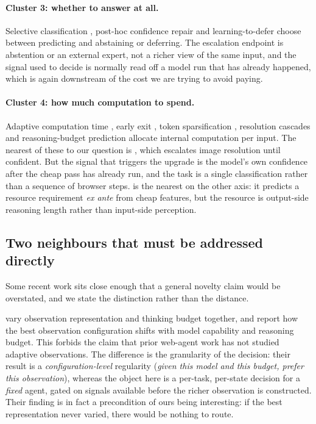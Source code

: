 \paragraph{Cluster 3: whether to answer at all.} Selective classification
\citep{geifman2017selective, geifman2019selectivenet, liu2019deepgamblers},
post-hoc confidence repair \citep{cattelan2024confidence} and learning-to-defer
\citep{mozannar2020defer} choose between predicting and abstaining or deferring.
The escalation endpoint is abstention or an external expert, not a richer view
of the same input, and the signal used to decide is normally read off a model
run that has already happened, which is again downstream of the cost we are
trying to avoid paying.

\paragraph{Cluster 4: how much computation to spend.} Adaptive computation
time \citep{graves2016act}, early exit \citep{bolukbasi2017adaptive,
xin2020deebert, schuster2022calm}, token sparsification \citep{rao2021dynamicvit},
resolution cascades \citep{wang2021notallimages} and reasoning-budget prediction
\citep{han2025tokenbudget} allocate internal computation per input. The nearest
of these to our question is \citet{wang2021notallimages}, which escalates image resolution until confident. But
the signal that triggers the upgrade is the model's own confidence after the
cheap pass has already run, and the task is a single classification rather
than a sequence of browser steps.
\citet{han2025tokenbudget} is the nearest on the other axis: it predicts a
resource requirement \emph{ex ante} from cheap features, but the resource is
output-side reasoning length rather than input-side perception.

\subsection{Two neighbours that must be addressed directly}
\label{sec:neighbours}

Some recent work sits close enough that a general novelty claim would be overstated, and we state the distinction rather than the distance.

\citet{enomoto2026readmore} vary observation representation and thinking budget
together, and report how the best observation configuration shifts with model
capability and reasoning budget. This forbids the claim that prior web-agent
work has not studied adaptive observations. The difference is the granularity of
the decision: their result is a \emph{configuration-level} regularity (\emph{given this model and this budget, prefer this observation}), whereas the object here is a per-task, per-state decision for a \emph{fixed} agent, gated on
signals available before the richer observation is constructed. Their finding is
in fact a precondition of ours being interesting: if the best representation
never varied, there would be nothing to route.

